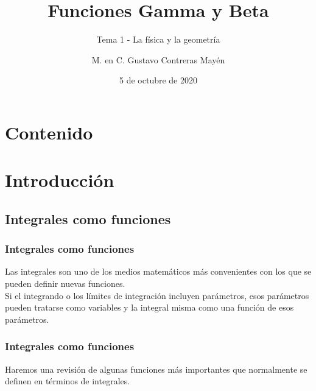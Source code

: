 
\title{\large{Funciones Gamma y Beta}}
\subtitle{Tema 1 - La física y la geometría}
\author{M. en C. Gustavo Contreras Mayén}
\date{5 de octubre de 2020}

\maketitle
\fontsize{14}{14}\selectfont
{}
\section*{Contenido}
\section{Introducción}
\subsection{Integrales como funciones}
\begin{frame}
\frametitle{Integrales como funciones}
Las integrales son uno de los medios matemáticos más convenientes con los que se pueden definir nuevas funciones.
\\
\bigskip
Si el integrando o los límites de integración incluyen parámetros, esos parámetros pueden tratarse como variables y la integral misma como una función de esos parámetros.
\end{frame}
\begin{frame}
\frametitle{Integrales como funciones}
Haremos una revisión de algunas funciones más importantes que normalmente se definen en términos de integrales.
\end{frame}

